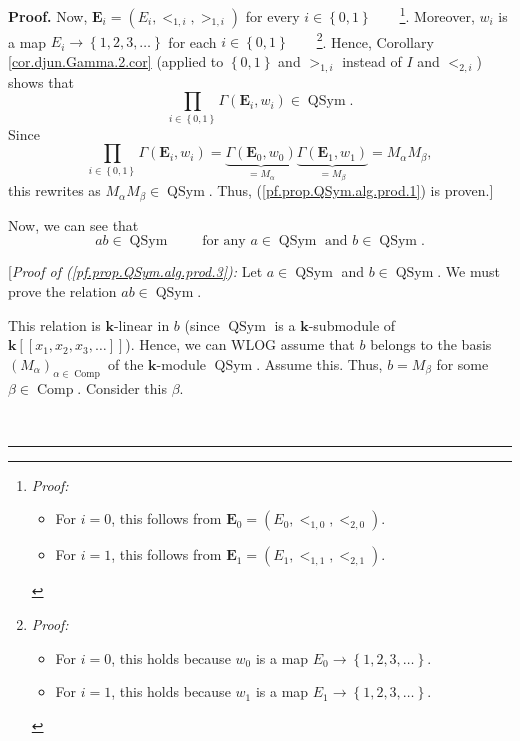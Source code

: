\documentclass[numbers=enddot,12pt,final,onecolumn,notitlepage,abstracton]{scrartcl}
\theoremstyle{definition}
\newenvironment{proof}[1][Proof]{\noindent\textbf{#1.} }{\ \rule{0.5em}{0.5em}}
\let\prodnonlimits\prod
\renewcommand{\prod}{\prodnonlimits\limits}
\newenvironment{verlong}{}{}
\begin{document}
\begin{verlong}
\begin{footnotesize}
\begin{proof}
Now, $\mathbf{E}_{i}=\left(  E_{i},<_{1,i},>_{1,i}\right)  $ for every
$i\in\left\{  0,1\right\}  $\ \ \ \ \footnote{\textit{Proof:}
\par
\begin{itemize}
\item For $i=0$, this follows from $\mathbf{E}_{0}=\left(  E_{0}%
,<_{1,0},<_{2,0}\right)  $.
\par
\item For $i=1$, this follows from $\mathbf{E}_{1}=\left(  E_{1}%
,<_{1,1},<_{2,1}\right)  $.
\end{itemize}
}. Moreover, $w_{i}$ is a map $E_{i}\rightarrow\left\{  1,2,3,\ldots\right\}
$ for each $i\in\left\{  0,1\right\}  $\ \ \ \ \footnote{\textit{Proof:}
\par
\begin{itemize}
\item For $i=0$, this holds because $w_{0}$ is a map $E_{0}\rightarrow\left\{
1,2,3,\ldots\right\}  $.
\par
\item For $i=1$, this holds because $w_{1}$ is a map $E_{1}\rightarrow\left\{
1,2,3,\ldots\right\}  $.
\end{itemize}
}. Hence, Corollary \ref{cor.djun.Gamma.2.cor} (applied to $\left\{
0,1\right\}  $ and $>_{1,i}$ instead of $I$ and $<_{2,i}$) shows that
\[
\prod_{i\in\left\{  0,1\right\}  }\Gamma\left(  \mathbf{E}_{i},w_{i}\right)
\in\operatorname*{QSym}.
\]
Since
\[
\prod_{i\in\left\{  0,1\right\}  }\Gamma\left(  \mathbf{E}_{i},w_{i}\right)
=\underbrace{\Gamma\left(  {\mathbf{E}}_{0},w_{0}\right)  }_{=M_{\alpha}%
}\underbrace{\Gamma\left(  {\mathbf{E}}_{1},w_{1}\right)  }_{=M_{\beta}%
}=M_{\alpha}M_{\beta},
\]
this rewrites as $M_{\alpha}M_{\beta}\in\operatorname*{QSym}$. Thus,
(\ref{pf.prop.QSym.alg.prod.1}) is proven.]

Now, we can see that%
\begin{equation}
ab\in\operatorname*{QSym}\ \ \ \ \ \ \ \ \ \ \text{for any }a\in
\operatorname*{QSym}\text{ and }b\in\operatorname*{QSym}.
\label{pf.prop.QSym.alg.prod.3}%
\end{equation}


[\textit{Proof of (\ref{pf.prop.QSym.alg.prod.3}):} Let $a\in
\operatorname*{QSym}$ and $b\in\operatorname*{QSym}$. We must prove the
relation $ab\in\operatorname*{QSym}$.

This relation is $\mathbf{k}$-linear in $b$ (since $\operatorname*{QSym}$ is a
$\mathbf{k}$-submodule of $\mathbf{k}\left[  \left[  x_{1},x_{2},x_{3}%
,\ldots\right]  \right]  $). Hence, we can WLOG assume that $b$ belongs to the
basis $\left(  M_{\alpha}\right)  _{\alpha\in\operatorname*{Comp}}$ of the
$\mathbf{k}$-module $\operatorname*{QSym}$. Assume this. Thus, $b=M_{\beta}$
for some $\beta\in\operatorname*{Comp}$. Consider this $\beta$.


\end{proof}
\end{footnotesize}
\end{verlong}
\end{document}
